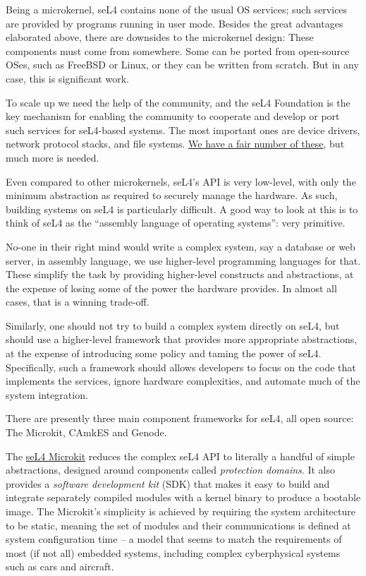 \documentclass[english,a4paper,12pt]{report}
\begin{document}
  Being a microkernel, seL4 contains none of the usual OS
  services; such services are  provided by  programs running in user
  mode. Besides the great advantages elaborated above,
  there are downsides to the microkernel design:  These components
  must come from somewhere. Some can be ported from open-source OSes, such as
  FreeBSD or Linux, or they can be written from scratch. But in any
  case, this is significant work.

  To scale up we need the help of the community, and the seL4
  Foundation is the key mechanism for enabling the community to
  cooperate and develop or port such services for seL4-based
  systems. The most important ones are device drivers, network
  protocol stacks, and file
  systems. \href{https://docs.sel4.systems/projects/available-user-components.html}{We
    have a fair number of these}, but much  more is needed.

  Even compared to other microkernels, seL4's API is very low-level,
  with only the minimum abstraction as required to securely manage the
  hardware. As such, building systems on seL4 is particularly
  difficult. A good way to look at this is to think of seL4 as the
  ``assembly language of operating systems'': very primitive.

  No-one in their right mind would write a complex system, say a
  database or web server, in assembly language, we use higher-level
  programming languages for that. These simplify the task by providing
  higher-level constructs and abstractions, at the expense of losing
  some of the power the hardware provides. In almost all cases, that
  is a winning trade-off.

  Similarly, one should not try to build a complex system directly on
  seL4, but should use a higher-level framework that provides more
  appropriate abstractions, at the expense of introducing some policy
  and taming the power of seL4. Specifically, such a framework should allows developers
  to focus on the code that implements the services, ignore hardware
  complexities, and automate
  much of the system integration.

  There are presently three main
  component frameworks for seL4, all open source: The Microkit, CAmkES
  and Genode.

  The \href{https://trustworthy.systems/projects/microkit/}{seL4 Microkit} reduces
  the complex seL4 API to literally a handful of simple abstractions,
  designed around components called \emph{protection domains}. It also
  provides a \emph{software development kit} (SDK) that makes it easy
  to build and integrate separately compiled modules with a kernel
  binary to produce a bootable image. The Microkit's simplicity is
  achieved by requiring the system architecture to be static, meaning
  the set of modules and their communications is defined at system
  configuration time -- a model that seems to match the requirements
  of most (if not all) embedded systems, including complex
  cyberphysical systems such as cars and aircraft.
\end{document}
